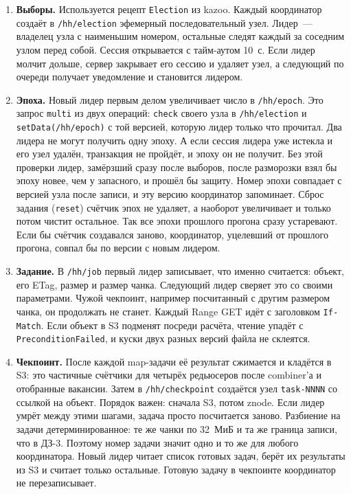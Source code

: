 \documentclass[11pt,a4paper]{article}
\begin{document}
\begin{enumerate}
  \item \textbf{Выборы.} Используется рецепт \texttt{Election} из kazoo. Каждый координатор создаёт в \texttt{/hh/election} эфемерный последовательный узел. Лидер~--- владелец узла с наименьшим номером, остальные следят каждый за соседним узлом перед собой. Сессия открывается с тайм-аутом 10~с. Если лидер молчит дольше, сервер закрывает его сессию и удаляет узел, а следующий по очереди получает уведомление и становится лидером.
  \item \textbf{Эпоха.} Новый лидер первым делом увеличивает число в \texttt{/hh/epoch}. Это запрос \texttt{multi} из двух операций: \texttt{check} своего узла в \texttt{/hh/election} и \texttt{setData(/hh/epoch)} с той версией, которую лидер только что прочитал. Два лидера не могут получить одну эпоху. А если сессия лидера уже истекла и его узел удалён, транзакция не пройдёт, и эпоху он не получит. Без этой проверки лидер, замёрзший сразу после выборов, после разморозки взял бы эпоху новее, чем у запасного, и прошёл бы защиту. Номер эпохи совпадает с версией узла после записи, и эту версию координатор запоминает. Сброс задания (\texttt{reset}) счётчик эпох не удаляет, а наоборот увеличивает и только потом чистит остальное. Так все эпохи прошлого прогона сразу устаревают. Если бы счётчик создавался заново, координатор, уцелевший от прошлого прогона, совпал бы по версии с новым лидером.
  \item \textbf{Задание.} В \texttt{/hh/job} первый лидер записывает, что именно считается: объект, его ETag, размер и размер чанка. Следующий лидер сверяет это со своими параметрами. Чужой чекпоинт, например посчитанный с другим размером чанка, он продолжать не станет. Каждый Range GET идёт с заголовком \texttt{If-Match}. Если объект в S3 подменят посреди расчёта, чтение упадёт с \texttt{PreconditionFailed}, и куски двух разных версий файла не склеятся.
  \item \textbf{Чекпоинт.} После каждой map-задачи её результат сжимается и кладётся в S3: это частичные счётчики для четырёх редьюсеров после combiner'а и отобранные вакансии. Затем в \texttt{/hh/checkpoint} создаётся узел \texttt{task-NNNN} со ссылкой на объект. Порядок важен: сначала S3, потом znode. Если лидер умрёт между этими шагами, задача просто посчитается заново. Разбиение на задачи детерминированное: те же чанки по 32~МиБ и та же граница записи, что в ДЗ-3. Поэтому номер задачи значит одно и то же для любого координатора. Новый лидер читает список готовых задач, берёт их результаты из S3 и считает только остальные. Готовую задачу в чекпоинте координатор не перезаписывает.

\end{enumerate}
\end{document}
